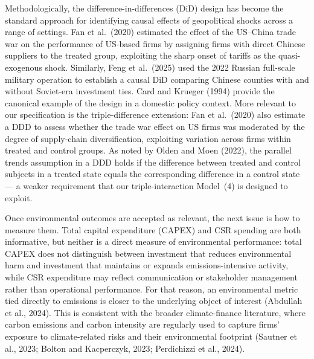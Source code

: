 \documentclass[authoryear,preprint,review,12pt]{elsarticle}
\begin{document}
Methodologically, the difference-in-differences (DiD) design has become the standard approach for identifying causal effects of geopolitical shocks across a range of settings. Fan et al.\ (2020) estimated the effect of the US--China trade war on the performance of US-based firms by assigning firms with direct Chinese suppliers to the treated group, exploiting the sharp onset of tariffs as the quasi-exogenous shock. Similarly, Feng et al.\ (2025) used the 2022 Russian full-scale military operation to establish a causal DiD comparing Chinese counties with and without Soviet-era investment ties. Card and Krueger (1994) provide the canonical example of the design in a domestic policy context. More relevant to our specification is the triple-difference extension: Fan et al.\ (2020) also estimate a DDD to assess whether the trade war effect on US firms was moderated by the degree of supply-chain diversification, exploiting variation across firms within treated and control groups. As noted by Olden and Moen (2022), the parallel trends assumption in a DDD holds if the difference between treated and control subjects in a treated state equals the corresponding difference in a control state --- a weaker requirement that our triple-interaction Model~(4) is designed to exploit.

Once environmental outcomes are accepted as relevant, the next issue is how to measure them. Total capital expenditure (CAPEX) and CSR spending are both informative, but neither is a direct measure of environmental performance: total CAPEX does not distinguish between investment that reduces environmental harm and investment that maintains or expands emissions-intensive activity, while CSR expenditure may reflect communication or stakeholder management rather than operational performance. For that reason, an environmental metric tied directly to emissions is closer to the underlying object of interest (Abdullah et al., 2024). This is consistent with the broader climate-finance literature, where carbon emissions and carbon intensity are regularly used to capture firms' exposure to climate-related risks and their environmental footprint (Sautner et al., 2023; Bolton and Kacperczyk, 2023; Perdichizzi et al., 2024).
\end{document}
